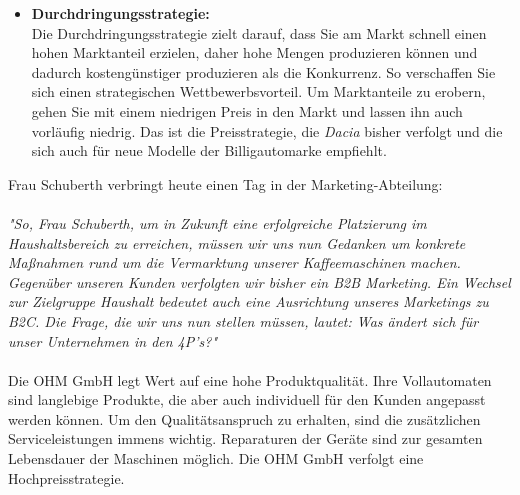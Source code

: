 {{\begin{itemize}
    \item \textbf{Durchdringungsstrategie:} \\
    Die Durchdringungsstrategie zielt darauf, dass Sie am Markt schnell einen hohen Marktanteil erzielen, daher hohe Mengen produzieren können und dadurch kostengünstiger produzieren als die Konkurrenz. 
    So verschaffen Sie sich einen strategischen Wettbewerbsvorteil. 
    Um Marktanteile zu erobern, gehen Sie mit einem niedrigen Preis in den Markt und lassen ihn auch vorläufig niedrig. 
    Das ist die Preisstrategie, die \textit{Dacia} bisher verfolgt und die sich auch für neue Modelle der Billigautomarke empfiehlt.
\end{itemize}
}


Frau Schuberth verbringt heute einen Tag in der Marketing-Abteilung: 
\\~\\
\textit{"So, Frau Schuberth, um in Zukunft eine erfolgreiche Platzierung im Haushaltsbereich zu erreichen, müssen wir uns nun Gedanken um konkrete Maßnahmen rund um die Vermarktung unserer Kaffeemaschinen machen. Gegenüber unseren Kunden verfolgten wir bisher ein B2B Marketing. Ein Wechsel zur Zielgruppe Haushalt bedeutet auch eine Ausrichtung unseres Marketings zu B2C. Die Frage, die wir uns nun stellen müssen, lautet: Was ändert sich für unser Unternehmen in den 4P’s?"} 
\\~\\
Die OHM GmbH legt Wert auf eine hohe Produktqualität. Ihre Vollautomaten sind langlebige Produkte, die aber auch individuell für den Kunden angepasst werden können. Um den Qualitätsanspruch zu erhalten, sind die zusätzlichen Serviceleistungen immens wichtig. Reparaturen der Geräte sind zur gesamten Lebensdauer der Maschinen möglich. Die OHM GmbH verfolgt eine Hochpreisstrategie. 
\\~\\
}
